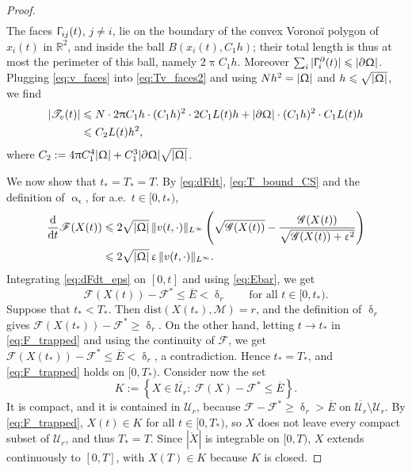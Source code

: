 \documentclass[letterpaper,11pt,twoside]{article}
\numberwithin{figure}{section}
\numberwithin{table}{section}
\theoremstyle{cpamplain}
\theoremstyle{cpamdefinition}
\newcommand{\R}{\mathbb{R}}
\newcommand{\diff}{\mathrm{d}}
\newcommand{\dist}{\mathrm{dist}}
\let\alpha\upalpha
\let\delta\updelta
\let\varepsilon\upvarepsilon
\let\pi\uppi
\let\Gamma\Upgamma
\let\Omega\Upomega
\renewcommand{\le}{\leqslant}
\renewcommand{\ge}{\geqslant}
\numberwithin{equation}{section}
\begin{document}
\begin{proof}
\begin{equation}
\begin{aligned}
\end{aligned}
\end{equation}
The faces $\Gamma_{ij}(t)$, $j\ne i$, lie on the boundary of the convex Vorono\"i polygon of $x_i(t)$ in $\R^2$, and inside the ball $B(x_i(t),C_1h)$; their total length is thus at most the perimeter of this ball, namely $2\pi C_1h$.
Moreover $\sum_i|\Gamma_i^\partial(t)|\le|\partial\Omega|$.
Plugging \eqref{eq:v_faces} into \eqref{eq:Tv_faces2} and using $Nh^2=|\Omega|$ and $h\le\sqrt{|\Omega|}$, we find
\begin{equation}\label{eq:T_bound_h2}
\begin{aligned}
|\mathscr T_v(t)|
&\le N\cdot 2\pi C_1h\cdot(C_1h)^2\cdot 2C_1L(t)h
+|\partial\Omega|\cdot(C_1h)^2\cdot C_1L(t)h\\
&\le C_2L(t)h^2,
\end{aligned}
\end{equation}
where $C_2:=4\pi C_1^4|\Omega|+C_1^3|\partial\Omega|\sqrt{|\Omega|}$.

We now show that $t_\ast=T_\ast=T$.
By \eqref{eq:dFdt}, \eqref{eq:T_bound_CS} and the definition of $\alpha_\varepsilon$, for a.e.\ $t\in[0,t_\ast)$,
\begin{equation}\label{eq:dFdt_eps}
\begin{aligned}
\frac{\diff}{\diff t}\mathscr F(X(t))
&\le 2\sqrt{|\Omega|}\,\|v(t,\cdot)\|_{L^\infty}
\left(\sqrt{\mathscr G(X(t))}-\frac{\mathscr G(X(t))}{\sqrt{\mathscr G(X(t))+\varepsilon^2}}\right)\\
&\le 2\sqrt{|\Omega|}\,\varepsilon\,\|v(t,\cdot)\|_{L^\infty}.
\end{aligned}
\end{equation}
Integrating \eqref{eq:dFdt_eps} on $[0,t]$ and using \eqref{eq:Ebar}, we get
\begin{equation}\label{eq:F_trapped}
\mathscr F(X(t))-\mathscr F^\ast\le\overline E<\delta_r
\qquad\text{for all }t\in[0,t_\ast).
\end{equation}
Suppose that $t_\ast<T_\ast$. Then $\dist(X(t_\ast),\mathcal M)=r$, and the definition of $\delta_r$ gives $\mathscr F(X(t_\ast))-\mathscr F^\ast\ge\delta_r$.
On the other hand, letting $t\to t_\ast$ in \eqref{eq:F_trapped} and using the continuity of $\mathscr F$, we get $\mathscr F(X(t_\ast))-\mathscr F^\ast\le\overline E<\delta_r$, a contradiction.
Hence $t_\ast=T_\ast$, and \eqref{eq:F_trapped} holds on $[0,T_\ast)$.
Consider now the set
\[
K:=\left\{X\in\overline{\mathcal U_r}:\ \mathscr F(X)-\mathscr F^\ast\le\overline E\right\}.
\]
It is compact, and it is contained in $\mathcal U_r$, because $\mathscr F-\mathscr F^\ast\ge\delta_r>\overline E$ on $\overline{\mathcal U_r}\setminus\mathcal U_r$.
By \eqref{eq:F_trapped}, $X(t)\in K$ for all $t\in[0,T_\ast)$, so $X$ does not leave every compact subset of $\mathcal U_r$, and thus $T_\ast=T$.
Since $|\dot X|$ is integrable on $[0,T)$, $X$ extends continuously to $[0,T]$, with $X(T)\in K$ because $K$ is closed.


\end{proof}
\end{document}
